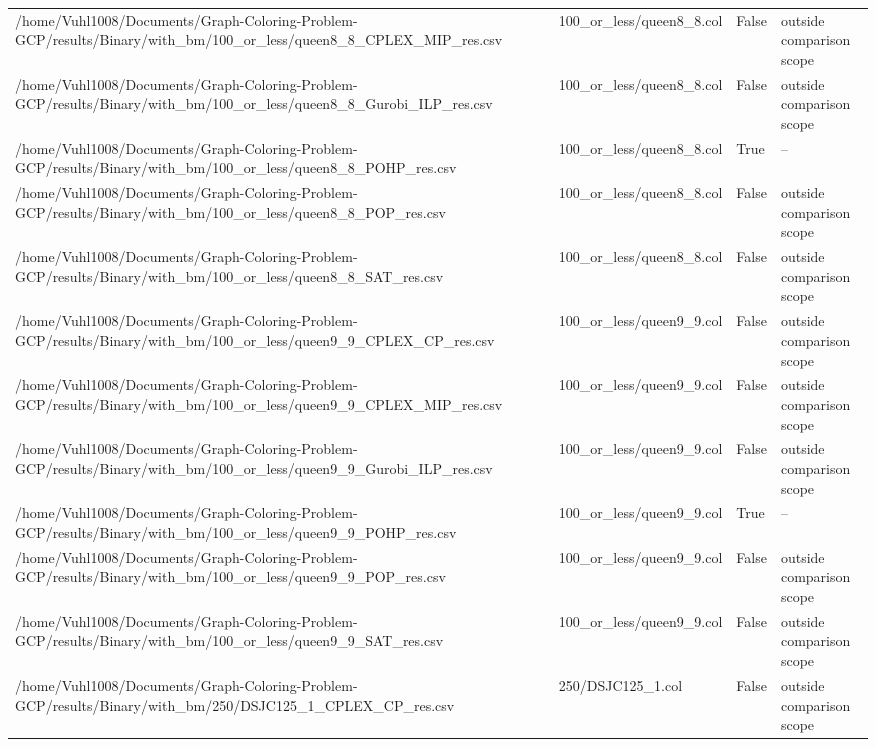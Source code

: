 \begin{table}[htbp]
\begin{tabular}{llll}
/home/Vuhl1008/Documents/Graph-Coloring-Problem-GCP/results/Binary/with\_bm/100\_or\_less/queen8\_8\_CPLEX\_MIP\_res.csv & 100\_or\_less/queen8\_8.col & False & outside comparison scope \\
/home/Vuhl1008/Documents/Graph-Coloring-Problem-GCP/results/Binary/with\_bm/100\_or\_less/queen8\_8\_Gurobi\_ILP\_res.csv & 100\_or\_less/queen8\_8.col & False & outside comparison scope \\
/home/Vuhl1008/Documents/Graph-Coloring-Problem-GCP/results/Binary/with\_bm/100\_or\_less/queen8\_8\_POHP\_res.csv & 100\_or\_less/queen8\_8.col & True & -- \\
/home/Vuhl1008/Documents/Graph-Coloring-Problem-GCP/results/Binary/with\_bm/100\_or\_less/queen8\_8\_POP\_res.csv & 100\_or\_less/queen8\_8.col & False & outside comparison scope \\
/home/Vuhl1008/Documents/Graph-Coloring-Problem-GCP/results/Binary/with\_bm/100\_or\_less/queen8\_8\_SAT\_res.csv & 100\_or\_less/queen8\_8.col & False & outside comparison scope \\
/home/Vuhl1008/Documents/Graph-Coloring-Problem-GCP/results/Binary/with\_bm/100\_or\_less/queen9\_9\_CPLEX\_CP\_res.csv & 100\_or\_less/queen9\_9.col & False & outside comparison scope \\
/home/Vuhl1008/Documents/Graph-Coloring-Problem-GCP/results/Binary/with\_bm/100\_or\_less/queen9\_9\_CPLEX\_MIP\_res.csv & 100\_or\_less/queen9\_9.col & False & outside comparison scope \\
/home/Vuhl1008/Documents/Graph-Coloring-Problem-GCP/results/Binary/with\_bm/100\_or\_less/queen9\_9\_Gurobi\_ILP\_res.csv & 100\_or\_less/queen9\_9.col & False & outside comparison scope \\
/home/Vuhl1008/Documents/Graph-Coloring-Problem-GCP/results/Binary/with\_bm/100\_or\_less/queen9\_9\_POHP\_res.csv & 100\_or\_less/queen9\_9.col & True & -- \\
/home/Vuhl1008/Documents/Graph-Coloring-Problem-GCP/results/Binary/with\_bm/100\_or\_less/queen9\_9\_POP\_res.csv & 100\_or\_less/queen9\_9.col & False & outside comparison scope \\
/home/Vuhl1008/Documents/Graph-Coloring-Problem-GCP/results/Binary/with\_bm/100\_or\_less/queen9\_9\_SAT\_res.csv & 100\_or\_less/queen9\_9.col & False & outside comparison scope \\
/home/Vuhl1008/Documents/Graph-Coloring-Problem-GCP/results/Binary/with\_bm/250/DSJC125\_1\_CPLEX\_CP\_res.csv & 250/DSJC125\_1.col & False & outside comparison scope \\

\end{tabular}
\end{table}
